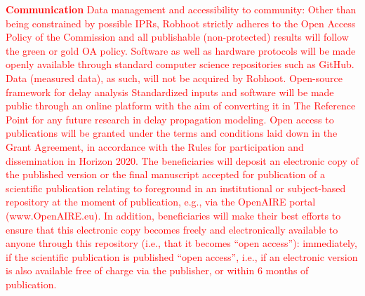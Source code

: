 \documentclass[11pt, a4paper]{article} %
\begin{document}
\textcolor{red}{{\bf Communication}
Data management and accessibility to community:
Other than being constrained by possible IPRs, Robhoot strictly
adheres to the Open Access Policy of the Commission and all
publishable (non-protected) results will follow the green or gold OA
policy. Software as well as hardware protocols will be made openly
available through standard computer science repositories such as
GitHub. Data (measured data), as such, will not be acquired by
Robhoot. Open-source framework for delay analysis Standardized inputs
and software will be made public through an online platform with the
aim of converting it in The Reference Point for any future research in
delay propagation modeling. Open access to publications will be
granted under the terms and conditions laid down in the Grant
Agreement, in accordance with the Rules for participation and
dissemination in Horizon 2020. The beneficiaries will deposit an
electronic copy of the published version or the final manuscript
accepted for publication of a scientific publication relating to
foreground in an institutional or subject-based repository at the
moment of publication, e.g., via the OpenAIRE portal
(www.OpenAIRE.eu). In addition, beneficiaries will make their best
efforts to ensure that this electronic copy becomes freely and
electronically available to anyone through this repository (i.e., that
it becomes “open access”): immediately, if the scientific publication
is published “open access”, i.e., if an electronic version is also
available free of charge via the publisher, or within 6 months of
publication.}

\end{document}

